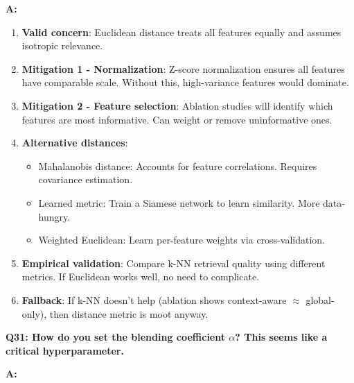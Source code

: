 \documentclass[11pt]{article}
\begin{document}
\textbf{A:}

\begin{enumerate}
    \item \textbf{Valid concern}: Euclidean distance treats all features equally and assumes isotropic relevance.

    \item \textbf{Mitigation 1 - Normalization}: Z-score normalization ensures all features have comparable scale. Without this, high-variance features would dominate.

    \item \textbf{Mitigation 2 - Feature selection}: Ablation studies will identify which features are most informative. Can weight or remove uninformative ones.

    \item \textbf{Alternative distances}:
    \begin{itemize}
        \item Mahalanobis distance: Accounts for feature correlations. Requires covariance estimation.
        \item Learned metric: Train a Siamese network to learn similarity. More data-hungry.
        \item Weighted Euclidean: Learn per-feature weights via cross-validation.
    \end{itemize}

    \item \textbf{Empirical validation}: Compare k-NN retrieval quality using different metrics. If Euclidean works well, no need to complicate.

    \item \textbf{Fallback}: If k-NN doesn't help (ablation shows context-aware $\approx$ global-only), then distance metric is moot anyway.
\end{enumerate}

\textbf{Q31: How do you set the blending coefficient $\alpha$? This seems like a critical hyperparameter.}

\textbf{A:}
\end{document}
